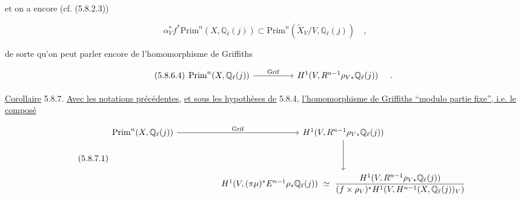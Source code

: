 %
%
%
et on a encore (cf. (5.8.2.3))

\begin{equation}\tag{5.8.6.3}
\alpha_V^*f^* \mathrm{Prim}^n(X,\mathbb{Q}_\ell(j)) \subset \mathrm{Prim}^n(\widetilde X_V/V,\mathbb{Q}_\ell(j)) \quad ,
\end{equation}

de sorte qu'on peut parler encore de l'homomorphisme de Griffiths

\begin{equation}\tag{5.8.6.4}
\begin{tikzcd}[column sep=huge]
\mathrm{Prim}^n(X,\mathbb{Q}_\ell(j)) \arrow[r, "\mathrm{Grif}"] & H^1(V,R^{n-1}\rho_{V*}\mathbb{Q}_\ell(j))
\end{tikzcd}
\quad .
\end{equation}

\underline{Corollaire} 5.8.7. \underline{Avec les notations précédentes}, \underline{et sous les hypothèses de} 5.8.4, \underline{l'homomorphisme de Griffiths ``modulo partie fixe'', i.e. le composé}

\begin{equation}\tag{5.8.7.1}
\begin{tikzcd}[column sep=huge, row sep=huge]
\mathrm{Prim}^n(X,\mathbb{Q}_\ell(j)) \arrow[r, "\mathrm{Grif}"] & H^1(V,R^{n-1}\rho_{V*}\mathbb{Q}_\ell(j)) \arrow[d] \\
{} & H^1(V,(\pi\mu)^*E^{n-1}\rho_*\mathbb{Q}_\ell(j)) \ \simeq \ \dfrac{H^1(V,R^{n-1}\rho_{V*}\mathbb{Q}_\ell(j))}{(f\times\rho_V)^* H^1(V,H^{n-1}(X,\mathbb{Q}_\ell(j))_V)}
\end{tikzcd}
\end{equation}

